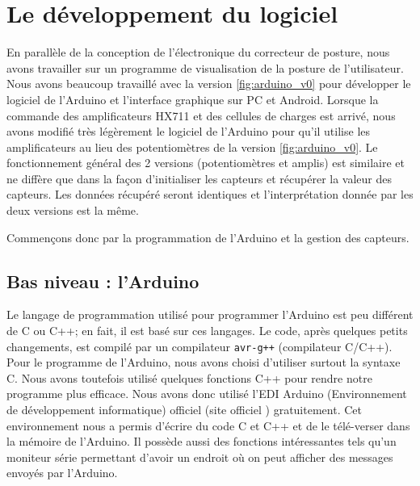 \documentclass{polytech/polytech}
\begin{document}
\chapter{Le développement du logiciel}
\label{chap:logiciel}

En parallèle de la conception de l'électronique du correcteur de posture, nous avons travailler sur un programme de visualisation de la posture de l'utilisateur. Nous avons beaucoup travaillé avec la version \ref{fig:arduino_v0} pour développer le logiciel de l'Arduino et l'interface graphique sur PC et Android. Lorsque la commande des amplificateurs HX711 et des cellules de charges est arrivé, nous avons modifié très légèrement le logiciel de l'Arduino pour qu'il utilise les amplificateurs au lieu des potentiomètres de la version \ref{fig:arduino_v0}. Le fonctionnement général des 2 versions (potentiomètres et amplis) est similaire et ne diffère que dans la façon d'initialiser les capteurs et récupérer la valeur des capteurs. Les données récupéré seront identiques et l'interprétation donnée par les deux versions est la même.

Commençons donc par la programmation de l'Arduino et la gestion des capteurs.


\section{Bas niveau : l'Arduino}
\label{sec:logiciel_bas}

Le langage de programmation utilisé pour programmer l'Arduino est peu différent de C ou C++; en fait, il est basé sur ces langages. Le code, après quelques petits changements, est compilé par un compilateur \texttt{avr-g++} (compilateur C/C++). Pour le programme de l'Arduino, nous avons choisi d'utiliser surtout la syntaxe C. Nous avons toutefois utilisé quelques fonctions C++ pour rendre notre programme plus efficace. Nous avons donc utilisé l'EDI Arduino (Environnement de développement informatique) officiel (site officiel \cite{site_arduino}) gratuitement. 
Cet environnement nous a permis d'écrire du code C et C++ et de le télé-verser dans la mémoire de l'Arduino. 
Il possède aussi des fonctions intéressantes tels qu'un moniteur série permettant d'avoir un endroit où on peut afficher des messages envoyés par l'Arduino.
\end{document}
